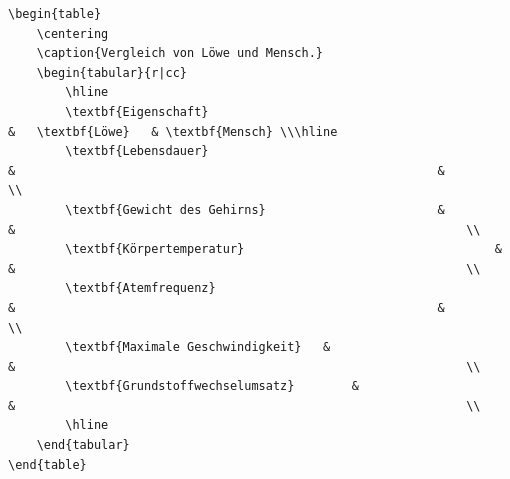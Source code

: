 \documentclass["WS\space 16-17\space -\space LaTeX-Kurs\space -\space Praesentation\space -\space 2.tex"]{subfiles}
\begin{document}
\begin{frame}[fragile]
	\Code
	\begin{lstlisting}[tabsize=1]
\begin{table}
	\centering
	\caption{Vergleich von Löwe und Mensch.}
	\begin{tabular}{r|cc}
		\hline
		\textbf{Eigenschaft}														&	\textbf{Löwe}	& \textbf{Mensch} \\\hline
		\textbf{Lebensdauer} 													&															& 																\\
		\textbf{Gewicht des Gehirns}						&															& 																\\ 
		\textbf{Körpertemperatur}									&															& 																\\
		\textbf{Atemfrequenz}													&															& 																\\
		\textbf{Maximale Geschwindigkeit}	&															& 																\\ 
		\textbf{Grundstoffwechselumsatz}		&															& 																\\
		\hline
	\end{tabular}
\end{table}
	\end{lstlisting}
\end{frame}
\end{document}
